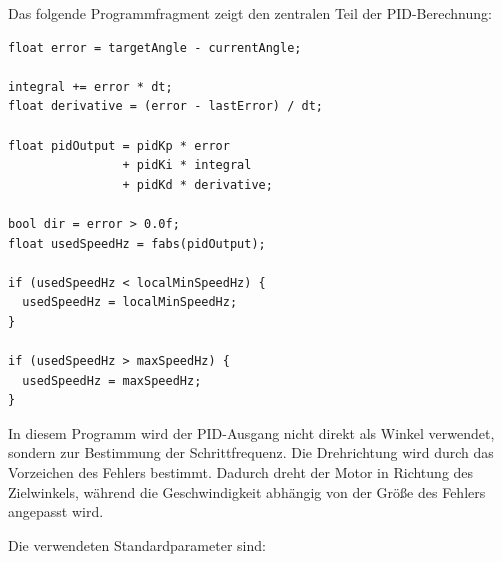\documentclass[a4paper,12pt]{article}
\begin{document}
Das folgende Programmfragment zeigt den zentralen Teil der PID-Berechnung:

\begin{verbatim}
float error = targetAngle - currentAngle;

integral += error * dt;
float derivative = (error - lastError) / dt;

float pidOutput = pidKp * error
                + pidKi * integral
                + pidKd * derivative;

bool dir = error > 0.0f;
float usedSpeedHz = fabs(pidOutput);

if (usedSpeedHz < localMinSpeedHz) {
  usedSpeedHz = localMinSpeedHz;
}

if (usedSpeedHz > maxSpeedHz) {
  usedSpeedHz = maxSpeedHz;
}
\end{verbatim}

In diesem Programm wird der PID-Ausgang nicht direkt als Winkel verwendet, sondern zur Bestimmung der Schrittfrequenz. Die Drehrichtung wird durch das Vorzeichen des Fehlers bestimmt. Dadurch dreht der Motor in Richtung des Zielwinkels, während die Geschwindigkeit abhängig von der Größe des Fehlers angepasst wird.

Die verwendeten Standardparameter sind:
\end{document}
